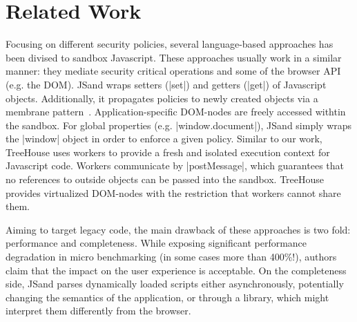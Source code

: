 \section{Related Work}
\label{sec:related}



Focusing on  different security policies, 
several language-based approaches has been divised to sandbox Javascript.  These
approaches usually work in a similar manner: they mediate security critical
operations and some of the browser API (e.g. the DOM).  
%
JSand wraps setters (\js|set|) and getters (\js|get|)  of Javascript
objects. Additionally, it propagates policies to newly created objects via  
a membrane pattern~\cite{XX}. Application-specific DOM-nodes are 
freely accessed withtin the sandbox. For global properties
(e.g. \js|window.document|), JSand simply wraps the \js|window| object in 
order to enforce a given policy.
% 
Similar to our work, TreeHouse uses workers to provide a fresh and isolated
execution context for Javascript code. Workers communicate by \js|postMessage|,
which guarantees that no references to outside objects can be passed into the
sandbox. TreeHouse provides virtualized DOM-nodes with the
restriction that workers cannot share them. 






Aiming to target legacy code, the main drawback of these approaches is two fold:
performance and completeness. While exposing significant performance degradation
in micro benchmarking (in some cases more than 400\%!), authors claim that the
impact on the user experience is acceptable.  On the completeness side,
JSand parses dynamically loaded scripts either asynchronously, potentially
changing the semantics of the application, or through a library, which might
interpret them differently from the browser. 



%

%



